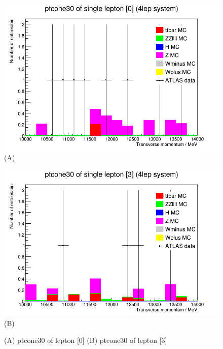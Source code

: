 \begin{figure}[h!]
    \centering
    \begin{minipage}{0.5\textwidth}
        \centering
        \includegraphics[width=\linewidth]{plots/06-03-2021/07-29_06-03-21.png}
        (A)
    \end{minipage}\hfill
    \begin{minipage}{0.5\textwidth}
        \centering
        \includegraphics[width=\linewidth]{plots/06-03-2021/08-28_06-03-21.png}
        (B)
    \end{minipage}
    \caption{(A) ptcone30 of lepton [0] (B) ptcone30 of lepton [3]}
    \label{fig:07-29_06-03-21}
\end{figure}

